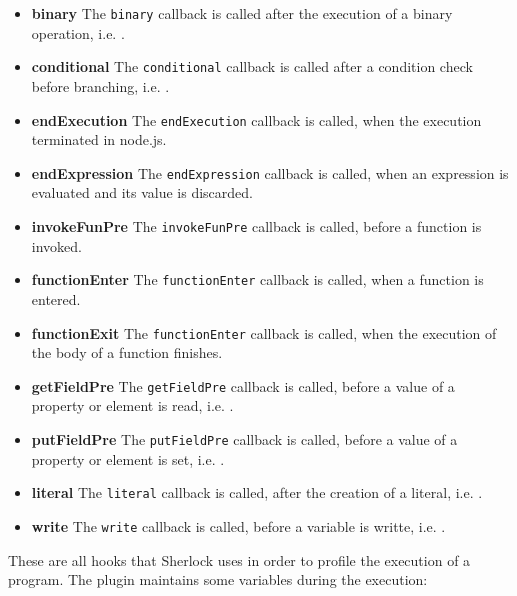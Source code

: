 \begin{itemize}
\item{\textbf{binary}} The \texttt{binary} callback is called after the execution of a binary operation, i.e. \js{<, +, ==, !=, >=}.

\item{\textbf{conditional}} The \texttt{conditional} callback is called after a condition check before branching, i.e. .

\item{\textbf{endExecution}} The \texttt{endExecution} callback is called, when the execution terminated in node.js.

\item{\textbf{endExpression}} The \texttt{endExpression} callback is called, when an expression is evaluated and its value is discarded.

\item{\textbf{invokeFunPre}} The \texttt{invokeFunPre} callback is called, before a function is invoked.

\item{\textbf{functionEnter}} The \texttt{functionEnter} callback is called, when a function is entered.

\item{\textbf{functionExit}} The \texttt{functionEnter} callback is called, when the execution of the body of a function finishes.

\item{\textbf{getFieldPre}} The \texttt{getFieldPre} callback is called, before a value of a property or element is read, i.e. .

\item{\textbf{putFieldPre}} The \texttt{putFieldPre} callback is called, before a value of a property or element is set, i.e. .

\item{\textbf{literal}} The \texttt{literal} callback is called, after the creation of a literal, i.e. .

\item{\textbf{write}} The \texttt{write} callback is called, before a variable is writte, i.e. .

\end{itemize}

These are all hooks that Sherlock uses in order to profile the execution of a program. The plugin maintains some variables during the execution:

